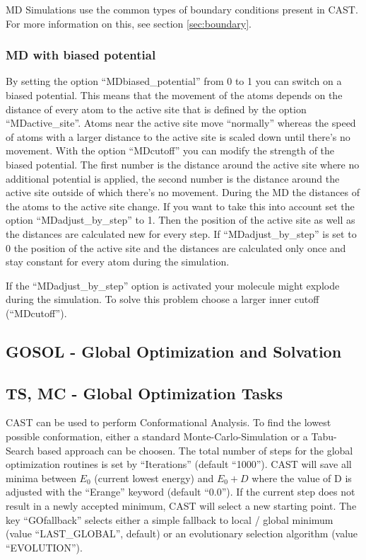 \documentclass[10pt,a4paper]{article} %
\newif\ifdevmode %
\begin{document}
	\ac{MD} Simulations use the common types of boundary conditions present in \ac{CAST}. For more information on this, see section \ref{sec:boundary}.
	
	\fi
	
	\subsubsection{MD with biased potential}
	
	By setting the option ``MDbiased\_potential'' from 0 to 1 you can switch on a biased potential. This means that the movement of the atoms depends on the distance of every atom to the active site that is defined by the option ``MDactive\_site''. Atoms near the active site move ``normally'' whereas the speed of atoms with a larger distance to the active site is scaled down until there's no movement. With the option ``MDcutoff'' you can modify the strength of the biased potential. The first number is the distance around the active site where no additional potential is applied, the second number is the distance around the active site outside of which there's no movement. During the MD the distances of the atoms to the active site change. If you want to take this into account set the option ``MDadjust\_by\_step'' to 1. Then the position of the active site as well as the distances are calculated new for every step. If ``MDadjust\_by\_step'' is set to 0 the position of the active site and the distances are calculated only once and stay constant for every atom during the simulation. 
	
	If the ``MDadjust\_by\_step'' option is activated your molecule might explode during the simulation. To solve this problem choose a larger inner cutoff (``MDcutoff'').
	
	\subsection{GOSOL - Global Optimization and Solvation}	
	\ifdevmode \colorbox{red}{write something here} \fi

	
	\subsection{TS, MC - Global Optimization Tasks}
	\ac{CAST} can be used to perform Conformational Analysis. To find the lowest possible conformation, either a standard Monte-Carlo-Simulation\supercite{mc_original, mmc_original} or a Tabu-Search\cite{tabusearch_original1, tabusearch_original2, tabusearch_original3} based approach can be choosen. The total number of steps for the global optimization routines is set by ``Iterations'' (default ``1000''). \ac{CAST} will save all minima between $E_0$ (current lowest energy) and $E_0 + D$ where the value of D is adjusted with the ``Erange'' keyword (default ``0.0'').
	If the current step does not result in a newly accepted minimum, \ac{CAST} will select a new starting point. The key ``GOfallback'' selects either a simple fallback to local / global minimum (value ``LAST\_GLOBAL'', default) or an evolutionary selection algorithm (value ``EVOLUTION'').
	
\end{document}
